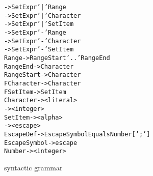 \begin{figure}[h]
\begin{scriptsize}
\begin{alltt}
                        -> SetExpr    '|' Range
                        -> SetExpr    '|' Character
                        -> SetExpr    '|' SetItem
                        -> SetExpr    '-' Range
                        -> SetExpr    '-' Character
                        -> SetExpr    '-' SetItem
      Range             -> RangeStart '..' RangeEnd
      RangeEnd          -> Character
      RangeStart        -> Character
      FCharacter        -> Character
      FSetItem          -> SetItem
      Character         -> <literal>
                        -> <integer>
      SetItem           -> <alpha>
                        -> <escape>
      EscapeDef         -> EscapeSymbol Equals Number [';']
      EscapeSymbol      -> {escape}
      Number            -> <integer>
    \end{alltt}
  \end{scriptsize}
  \caption{\dfae syntactic grammar}
  \label{fig:dfa-syn-grm}
\end{figure}
